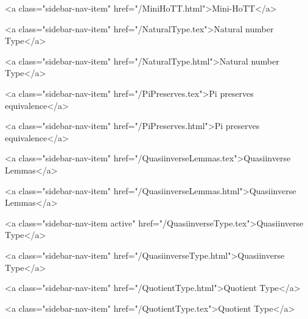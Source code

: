       
        
          <a class="sidebar-nav-item" href="/MiniHoTT.html">Mini-HoTT</a>
        
      
    
      
        
          <a class="sidebar-nav-item" href="/NaturalType.tex">Natural number Type</a>
        
      
    
      
        
          <a class="sidebar-nav-item" href="/NaturalType.html">Natural number Type</a>
        
      
    
      
        
          <a class="sidebar-nav-item" href="/PiPreserves.tex">Pi preserves equivalence</a>
        
      
    
      
        
          <a class="sidebar-nav-item" href="/PiPreserves.html">Pi preserves equivalence</a>
        
      
    
      
        
          <a class="sidebar-nav-item" href="/QuasiinverseLemmas.tex">Quasiinverse Lemmas</a>
        
      
    
      
        
          <a class="sidebar-nav-item" href="/QuasiinverseLemmas.html">Quasiinverse Lemmas</a>
        
      
    
      
        
          <a class="sidebar-nav-item active" href="/QuasiinverseType.tex">Quasiinverse Type</a>
        
      
    
      
        
          <a class="sidebar-nav-item" href="/QuasiinverseType.html">Quasiinverse Type</a>
        
      
    
      
        
          <a class="sidebar-nav-item" href="/QuotientType.html">Quotient Type</a>
        
      
    
      
        
          <a class="sidebar-nav-item" href="/QuotientType.tex">Quotient Type</a>
        
